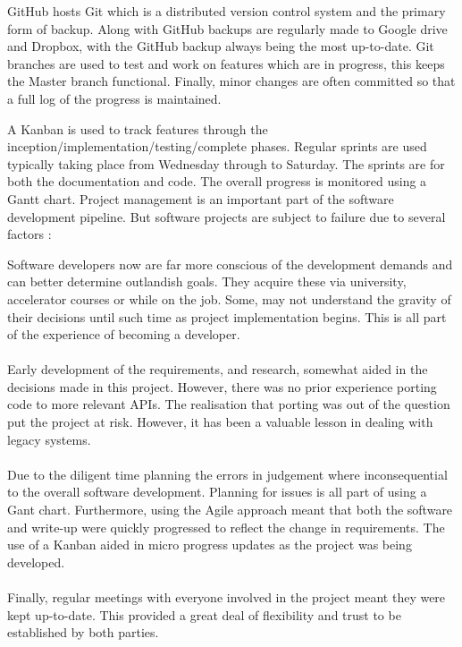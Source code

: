   GitHub hosts Git which is a distributed version control system and the primary form of backup. Along with GitHub backups are regularly made to Google drive and Dropbox, with the GitHub backup always being the most up-to-date. Git branches are used to test and work on features which are in progress, this keeps the Master branch functional. Finally, minor changes are often committed so that a full log of the progress is maintained.

  A Kanban is used to track features through the inception/implementation/testing/complete phases. Regular sprints are used typically taking place from Wednesday through to Saturday. The sprints are for both the documentation and code. The overall progress is monitored using a Gantt chart.
  Project management is an important part of the software development pipeline. But software projects are subject to failure due to several factors \cite{software_failure}:

  Software developers now are far more conscious of the development demands and can better determine outlandish goals. They acquire these via university, accelerator courses or while on the job. Some, may not understand the gravity of their decisions until such time as project implementation begins. This is all part of the experience of becoming a developer.\\\\
  Early development of the requirements, and research, somewhat aided in the decisions made in this project. However, there was no prior experience porting code to more relevant APIs. The realisation that porting was out of the question put the project at risk. However, it has been a valuable lesson in dealing with legacy systems.\\\\
  Due to the diligent time planning the errors in judgement where inconsequential to the overall software development. Planning for issues is all part of using a Gant chart. Furthermore, using the Agile approach meant that both the software and write-up were quickly progressed to reflect the change in requirements. The use of a Kanban aided in micro progress updates as the project was being developed.\\\\
  Finally, regular meetings with everyone involved in the project meant they were kept up-to-date. This provided a great deal of flexibility and trust to be established by both parties.

